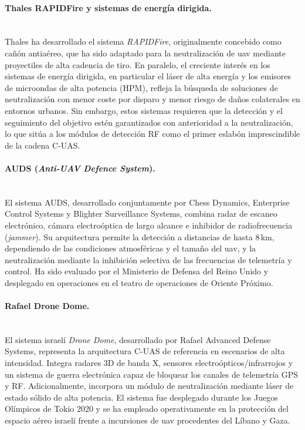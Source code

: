 \paragraph{Thales RAPIDFire y sistemas de energía dirigida.}\mbox{}\\[0.5em]
Thales ha desarrollado el sistema \textit{RAPIDFire}, originalmente concebido como
cañón antiaéreo, que ha sido adaptado para la neutralización de \gls{uav} mediante
proyectiles de alta cadencia de tiro. En paralelo, el creciente interés en los
sistemas de energía dirigida, en particular el láser de alta energía y los emisores
de microondas de alta potencia (HPM), refleja la búsqueda de soluciones de
neutralización con menor coste por disparo y menor riesgo de daños colaterales en
entornos urbanos. Sin embargo, estos sistemas requieren que la detección y el
seguimiento del objetivo estén garantizados con anterioridad a la neutralización,
lo que sitúa a los módulos de detección RF como el primer eslabón imprescindible
de la cadena C-UAS.

\paragraph{AUDS (\textit{Anti-UAV Defence System}).}\mbox{}\\[0.5em]
El sistema AUDS, desarrollado conjuntamente por Chess Dynamics, Enterprise Control
Systems y Blighter Surveillance Systems, combina radar de escaneo electrónico, cámara
electroóptica de largo alcance e inhibidor de radiofrecuencia (\textit{jammer}).
Su arquitectura permite la detección a distancias de hasta 8\,km, dependiendo de las
condiciones atmosféricas y el tamaño del \gls{uav}, y la neutralización mediante la
inhibición selectiva de las frecuencias de telemetría y control. Ha sido evaluado
por el Ministerio de Defensa del Reino Unido y desplegado en operaciones en el
teatro de operaciones de Oriente Próximo.

\paragraph{Rafael Drone Dome.}\mbox{}\\[0.5em]
El sistema israelí \textit{Drone Dome}, desarrollado por Rafael Advanced Defense
Systems, representa la arquitectura C-UAS de referencia en escenarios de alta
intensidad. Integra radares 3D de banda X, sensores electroópticos/infrarrojos y un
sistema de guerra electrónica capaz de bloquear los canales de telemetría GPS y RF.
Adicionalmente, incorpora un módulo de neutralización mediante láser de estado sólido
de alta potencia. El sistema fue desplegado durante los Juegos Olímpicos de Tokio
2020 y se ha empleado operativamente en la protección del espacio aéreo israelí
frente a incursiones de \gls{uav} procedentes del Líbano y Gaza.


